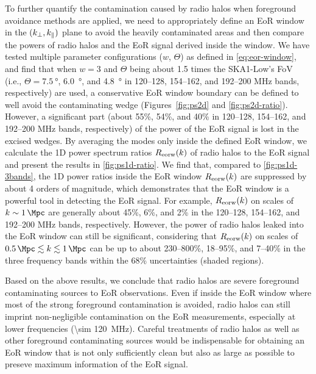 To further quantify the contamination caused by radio halos when
foreground avoidance methods are applied, we need to appropriately
define an EoR window in the $(k_{\perp}, k_{\parallel})$ plane to avoid the
heavily contaminated areas and then compare the powers of radio halos
and the EoR signal derived inside the window.
We have tested multiple parameter configurations ($w$, $\Theta$) as
defined in \autoref{eq:eor-window}, and find that when $w = 3$ and
$\Theta$ being about 1.5 times the SKA1-Low's FoV (i.e.,
$\Theta = \SI{7.5}{\degree}$, \SI{6.0}{\degree}, and \SI{4.8}{\degree}
in \numrange{120}{128}, \numrange{154}{162}, and \numrange{192}{200}
\si{\MHz} bands, respectively) are used, a conservative EoR window
boundary can be defined to well avoid the contaminating wedge
(Figures~\ref{fig:ps2d} and \ref{fig:ps2d-ratio}).
However, a significant part (about 55\%, 54\%, and 40\% in
\numrange{120}{128}, \numrange{154}{162},
and \numrange{192}{200} \si{\MHz} bands, respectively) of the power of
the EoR signal is lost in the excised wedges.
By averaging the modes only inside the defined EoR window, we calculate
the 1D power spectrum ratios $R_{\mathrm{eorw}}(k)$ of radio halos to the EoR
signal and present the results in \autoref{fig:ps1d-ratio}.
We find that, compared to \autoref{fig:ps1d-3bands}, the 1D power ratios
inside the EoR window $R_{\mathrm{eorw}}(k)$ are suppressed by about 4 orders
of magnitude, which demonstrates that the EoR window is a powerful tool
in detecting the EoR signal.
For example, $R_{\mathrm{eorw}}(k)$ on scales of $k \sim \SI{1}{\per\Mpc}$ are
generally about 45\%, 6\%, and 2\% in the \numrange{120}{128},
\numrange{154}{162}, and \numrange{192}{200} \si{\MHz} bands, respectively.
However, the power of radio halos leaked into the EoR window can still be
significant, considering that $R_{\mathrm{eorw}}(k)$ on scales of
$\SI{0.5}{\per\Mpc} \lesssim k \lesssim \SI{1}{\per\Mpc}$ can be up to
about \numrange{230}{800}\%, \numrange{18}{95}\%, and
\numrange{7}{40}\% in the three frequency bands within the
68\% uncertainties (shaded regions).

Based on the above results, we conclude that radio halos are severe
foreground contaminating sources to EoR observations.
Even if inside the EoR window where most of the strong foreground
contamination is avoided, radio halos can still imprint
non-negligible contamination on the EoR measurements, especially at
lower frequencies (\SI{\sim 120}{\MHz}).
Careful treatments of radio halos as well as other foreground contaminating
sources would be indispensable for obtaining an EoR window that is not only
sufficiently clean but also as large as possible to preseve maximum
information of the EoR signal.


